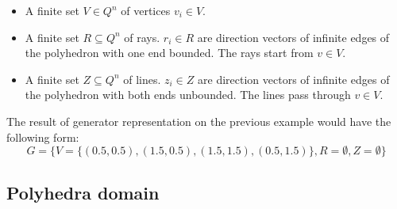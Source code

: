 \begin{itemize}
	\item A finite set $V\in Q^n$ of vertices $v_i \in V$.
	\item A finite set $R \subseteq Q^n$ of rays. $r_i \in R$ are direction vectors of infinite edges of the polyhedron with one end bounded. The rays start from $v \in V$.
	\item  A finite set $Z \subseteq Q^n$ of lines. $z_i \in Z$ are direction vectors of infinite edges of the polyhedron with both ends unbounded. The lines pass through $v \in V$.
\end{itemize}
The result of generator representation on the previous example would have the following form: 
\begin{equation}
	G = \{ V = \{(0.5,0.5),(1.5,0.5),(1.5,1.5),(0.5,1.5)\}, R = \emptyset, Z = \emptyset \}
\end{equation}
\subsection{Polyhedra domain}

